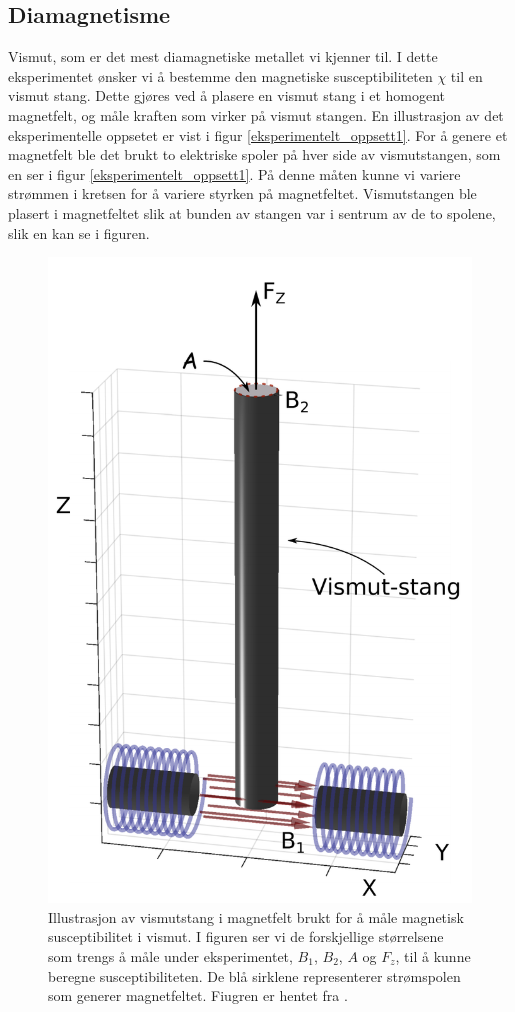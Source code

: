 \documentclass[%
 reprint,
 amsmath,amssymb,
 aps,
]{revtex4-1}
\begin{document}
\subsection{Diamagnetisme}
Vismut, som er det mest diamagnetiske metallet vi kjenner til. I dette eksperimentet ønsker vi å bestemme den magnetiske susceptibiliteten $\chi$ til en vismut stang. Dette gjøres ved å plasere en vismut stang i et homogent magnetfelt, og måle kraften som virker på vismut stangen. En illustrasjon av det eksperimentelle oppsetet er vist i figur \vref{eksperimentelt_oppsett1}. For å genere et magnetfelt ble det brukt to elektriske spoler på hver side av vismutstangen, som en ser i figur \vref{eksperimentelt_oppsett1}. På denne måten kunne vi variere strømmen i kretsen for å variere styrken på magnetfeltet. Vismutstangen ble plasert i magnetfeltet slik at bunden av stangen var i sentrum av de to spolene, slik en kan se i figuren.
\begin{figure}[h!]
  \centering
  \includegraphics[scale=0.38]{oppsett1.png}
  \caption{Illustrasjon av vismutstang i magnetfelt brukt for å måle magnetisk susceptibilitet i vismut. I figuren ser vi de forskjellige størrelsene som trengs å måle under eksperimentet, $B_1$, $B_2$, $A$ og $F_z$, til å kunne beregne susceptibiliteten. De blå sirklene representerer strømspolen som generer magnetfeltet. Fiugren er hentet fra \cite{oppgave}.}
  \label{eksperimentelt_oppsett1}
\end{figure}
\end{document}
